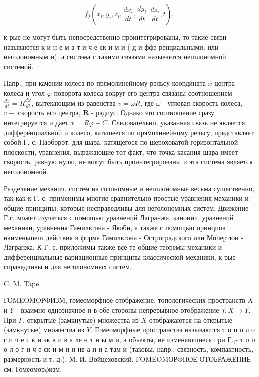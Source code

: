 \documentclass[10pt]{article}
\begin{document}
\[

f_{j}\left(x_{i}, y_{i}, z_{i}, \frac{d x_{i}}{d t}, \frac{d y_{i}}{d t}, \frac{d z_{i}}{d t}, t\right),

\]



к-рые не могут быть непосредственно проинтегрированы, то такие связи называются к и н е м а т и ч е ск и м и ( д и ффе ренциальными, или неголономным и), а система с такими связями называется неголономной системой.



Напр., при качении колеса по прямолинейному рельсу координата $x$ центра колеса и угол $\varphi$ поворота колеса вокруг его центра связаны соотношением $\frac{d x}{d t}=R \frac{d \varphi}{d t}$, вытекающим из равенства $v=\omega R$, где $\omega$ - угловая скорость колеса, $v-$ скорость его центра, $\boldsymbol{R}$ - радиус. Однако это соотношение сразу интегрируется и дает $x=R \varphi+C$. Следовательно, указанная связь не является дифференциальной и колесо, катяшееся по прямолинейному рельсу, представляет собой Г. с. Наоборот, для шара, катящегося по шероховатой горизонтальной плоскости, уравнения, выражающие тот факт, что точка касания шара имеет скорость, равную нулю, не могут быть проинтегрированы и эта система является неголономной.



Разделение механич. систем на голономные и неголономные весьма существенно, так как к Г. с. применимы многие сравнительно простые уравнения механики и общие принципы, которые несправедливы для неголономных систем. Движение Г.с. может изучаться с помощью уравнений Лагранжа, канонич. уравнений механики, уравнения Гамильтона - Якоби, а также с помощью принципа наименьшего действия в форме Гамильтона - Остроградского или Мопертюи - Лагранжа. К Г. с. приложимы также все те общие теоремы механики и дифференциальные вариационные принципы классической механики, к-рые справедливы и для неголономных систем.



C. M. Tape.



ГОMEOMOРФИЗМ, гомеоморфное отображение, топологических пространств $X$ и $Y$ - взаимно однозначное и в обе стороны непрерывное отображение $f: X \rightarrow Y$. При $\Gamma$. открытые (замкнутые) множества из $X$ отображаются на открытые (замкнутые) множества из $Y$. Гомеоморфные пространства называются т о п о л о г и ч е с к и эк в и в а ле н т н ы м и, а объекты, не изменяющиеся при Г.,- т о п о л о г и ч е ск и м и и нв а и и а там и (таковы, напр., связность, компактность, размерность и т. д.). М. И. Войцеховский. ГOMEOMОРФНОЕ ОТОБРАЖЕНИЕ - см. Гомеомор$\phi и з м$.
\end{document}

